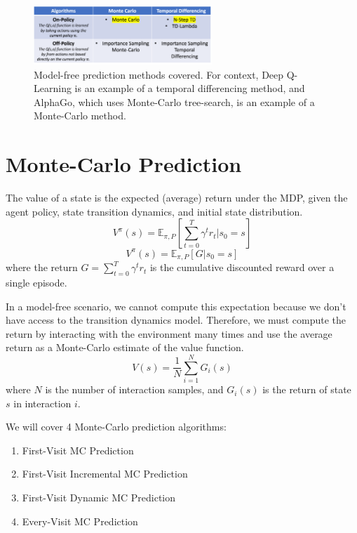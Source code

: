 \documentclass[11pt]{article}
\def\EE{\mathbb{E}}
\begin{document}
\begin{figure}[H]
    \centering
    \includegraphics[width=0.6\textwidth]{images/algo_table.png}
    \caption{Model-free prediction methods covered. For context, Deep Q-Learning is an example of a temporal differencing method, and AlphaGo, which uses Monte-Carlo tree-search, is an example of a Monte-Carlo method.}
    \label{fig:methods}
\end{figure}


\section{Monte-Carlo Prediction}
The value of a state is the expected (average) return under the MDP, given the agent policy, state transition dynamics, and initial state distribution. 
$$V^{\pi}(s) = \EE_{\pi, P}[\sum_{t=0}^T \gamma^t r_t|s_0=s]$$
$$V^{\pi}(s) = \EE_{\pi, P}[G|s_0=s]$$
where the return $G = \sum_{t=0}^T \gamma^t r_t$ is the cumulative discounted reward over a single episode.

In a model-free scenario, we cannot compute this expectation because we don't have access to the transition dynamics model. Therefore, we must compute the return by interacting with the environment many times and use the average return as a Monte-Carlo estimate of the value function.
$$V(s) = \frac{1}{N} \sum_{i=1}^N G_i(s)$$
where $N$ is the number of interaction samples, and $G_i(s)$ is the return of state $s$ in interaction $i$.  

We will cover 4 Monte-Carlo prediction algorithms:
\begin{enumerate}
    \item First-Visit MC Prediction
    \item First-Visit Incremental MC Prediction
    \item First-Visit Dynamic MC Prediction
    \item Every-Visit MC Prediction
\end{enumerate}
\end{document}
